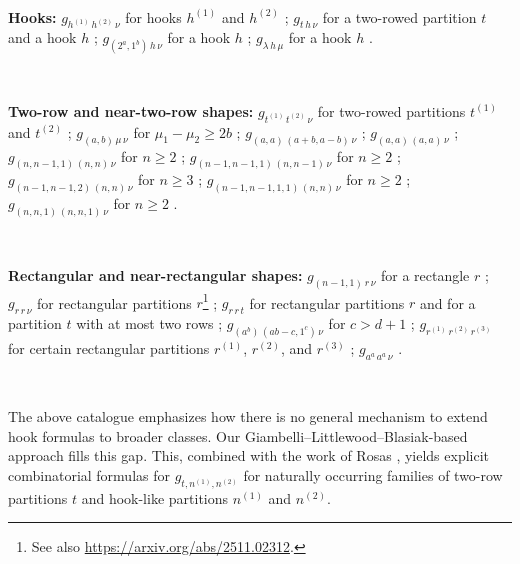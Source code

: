 \documentclass[12pt]{article}
\begin{document}
 \ 

\noindent \textbf{Hooks:} $ g_{h^{(1)} \, h^{(2)} \, \nu} $ for hooks $h^{(1)}$ and $h^{(2)}$ 
 \cite{GarsiaRemmel1985,Lascoux1980,Remmel1989,Rosas2001}; $ g_{t \, h \, \nu} $ for a two-rowed partition $t$ and a hook $h$ 
 \cite{BowmanDeVisscherOrellana2015,Remmel1992}; $ g_{(2^{a}, 1^{b}) \, h \, \nu} $ for
 a hook $h$ \cite{Remmel1992}; 
 $g_{\lambda \, h \, \mu }$ for a hook $h$ \cite{Blasiak20162018}. 

 \ 

\noindent \textbf{Two-row and near-two-row shapes:} $ g_{t^{(1)} \, t^{(2)} \, \nu } $ for two-rowed partitions $t^{(1)}$ and $t^{(2)}$ 
 \cite{BriandOrellanaRosas2009,RemmelWhitehead1994,Rosas2001}; $g_{(a, b) \, \mu \, \nu }$ for $\mu_1 - \mu_2 \geq 2 
 b$ \cite{BallantineOrellana2005,BallantineOrellana200507}; $g_{(a, a) \, (a+b,a-b) \, \nu }$ \cite{BrownvanWilligenburgZabrocki2010}; 
 $g_{(a, a) \, (a, a) \, \nu}$ \cite{GarsiaWallachXinZabrocki2012}; $g_{ (n, n-1, 1) \, (n, n) \, \nu }$ for $n \geq 2$ \cite{Tewari2015,TewariMSc}; 
$g_{ (n-1, n-1, 1) \, (n, n-1) \, \nu }$ for $n \geq 2$ \cite{Tewari2015,TewariMSc}; 
$g_{ (n-1, n-1, 2) \, (n, n) \, \nu }$ for $n \geq 3$ \cite{Tewari2015,TewariMSc}; 
$g_{ (n-1, n-1, 1,1) \, (n, n) \, \nu }$ for $n \geq 2$ \cite{Tewari2015,TewariMSc}; 
$g_{ (n, n, 1) \, (n, n, 1) \, \nu }$ for $n \geq 2$ \cite{Tewari2015,TewariMSc}. 

 \ 

\noindent \textbf{Rectangular and near-rectangular shapes:} $ g_{(n-1, 1) \, r \, \nu } $ for a rectangle $r$ \cite{BessenrodtKleshchev1999}; 
 $g_{r \, r \, \nu}$ for rectangular partitions $r$\footnote{See also \url{https://arxiv.org/abs/2511.02312}.} \cite{Manivel2011}; $ g_{r \, r \, 
 t } $ for rectangular partitions $r$ and for a partition $t$ with at most 
 two rows \cite{Vallejo2014}; 
$g_{(a^b) \, (a b - c, 1^c) \, \nu}$ for $c > d+1$ \cite{BallantineHallahan2016}; 
$g_{r^{(1)} \, r^{(2)} \, r^{(3)} }$ for certain rectangular partitions $r^{(1)}$, 
 $r^{(2)}$, and $r^{(3)}$ \cite{AmanovYeliussizov2023}; 
$g_{a^a \, a^a \, \nu}$ \cite{Zhao2024}. 

 \ 

\noindent The above catalogue emphasizes how there is no general mechanism to extend hook formulas to broader classes. Our 
 Giambelli--Littlewood--Blasiak-based approach fills this gap. This, combined with the work of Rosas \cite{Rosas2001}, yields explicit 
 combinatorial formulas for $g_{t, n^{(1)}, n^{(2)}}$ for naturally occurring families of two-row partitions $t$ and hook-like partitions 
 $n^{(1)}$ and $n^{(2)}$. 
\end{document}
